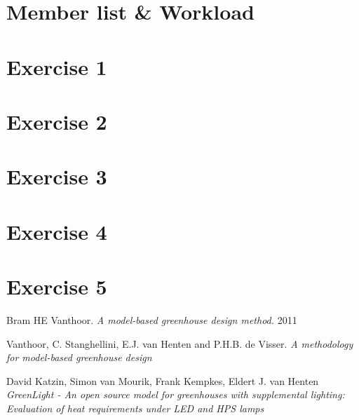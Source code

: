 \documentclass[a4paper]{article}
\begin{document}

\newpage
\tableofcontents
\newpage


\section{Member list \& Workload}



\section{Exercise 1}


\section{Exercise 2}


\section{Exercise 3}


\section{Exercise 4}



\newpage
\section{Exercise 5}


\begin{thebibliography}{80}


Bram HE Vanthoor.
\textit{A model-based greenhouse design method.}
2011

Vanthoor, C. Stanghellini,  E.J. van Henten and P.H.B. de Visser.
\textit{A methodology for model-based greenhouse design}

David Katzin, Simon van Mourik, Frank Kempkes, Eldert J. van Henten
\textit{
GreenLight - An open source model for
greenhouses with supplemental lighting:
Evaluation of heat requirements under LED
and HPS lamps}


\end{thebibliography}
\end{document}

